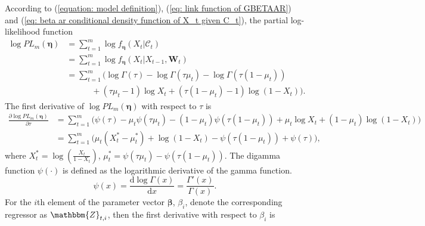 \documentclass{article}
\theoremstyle{definition}
\begin{document}
According to (\ref{equation: model definition}), (\ref{eq: link function of GBETAAR}) and (\ref{eq: beta ar conditional density function of X_t given C_t}), the partial log-likelihood function
\begin{equation}
\label{eq: closed-form of the partial log-likelihood function}
    \begin{aligned}
        \log PL_{m}(\bm{\eta})&= \sum_{t=1}^m \log f_{\bm{\eta}}(X_t|\mathcal{C}_t) \\
        &= \sum_{t=1}^m \log f_{\bm{\eta}}(X_t|X_{t-1},\bm{W}_t) \\
        &= \sum_{t=1}^m \Big(\log\Gamma(\tau) -\log \Gamma(\tau \mu_t)-\log\Gamma(\tau(1-\mu_t)) \\
        & \quad \quad \quad +(\tau \mu_t-1) \log X_t+(\tau(1-\mu_t)-1) \log (1-X_t) \Big).
    \end{aligned}
\end{equation}
The first derivative of $\log PL_m(\bm{\eta})$ with respect to $\tau$ is
\begin{equation*}
\begin{aligned}
    \frac{\partial \log PL_{m}(\bm{\eta})}{\partial \tau} & = \sum_{t=1}^m \Big(\psi(\tau)-\mu_t \psi(\tau \mu_t)-(1-\mu_t) \psi(\tau(1-\mu_t))+\mu_t \log X_t+(1-\mu_t) \log(1-X_t) \Big)\\
    &= \sum_{t=1}^m \Big(\mu_t(X_t^*-\mu_t^*)+\log(1-X_t)-\psi(\tau(1-\mu_t))+\psi(\tau) \Big),
\end{aligned}
\end{equation*}
where $X_t^* = \log(\frac{X_t}{1-X_t})$, $\mu_t^* = \psi(\tau \mu_t)-\psi(\tau(1-\mu_t))$. The digamma function $\psi(\cdot)$ is defined as the logarithmic derivative of the gamma function.
\begin{equation*}
    \psi(x) = \frac{\text{d}\log \Gamma(x)}{\text{d}x} = \frac{\Gamma' (x)}{\Gamma(x)}.
\end{equation*}
For the $i$th element of the parameter vector $\bm{\beta}$, $\beta_i$, denote the corresponding regressor as $\mathbbm{Z}_{t,i}$, then the first derivative with respect to $\beta_i$ is
\end{document}
